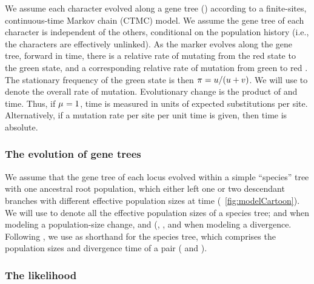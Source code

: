 We assume each character evolved along a gene tree (\genetree)
according to a finite-sites, continuous-time Markov chain (CTMC) model.
We assume the gene tree of each character is independent of the others,
conditional on the population history (i.e., the characters are effectively
unlinked).
As the marker evolves along the gene tree, forward in time, there is a relative
rate \rgmurate of mutating from the red state to the green state,
and a corresponding relative rate \grmurate of mutation from green to red
\citep{Bryant2012,Oaks2018ecoevolity}.
The stationary frequency of the green state is then
$\pi_{} = u / (u + v)$.
We will use \murate to denote the overall rate of mutation.
Evolutionary change is the product of \murate and time.
Thus, if $\mu_{} = 1$, time is measured in
units of expected substitutions per site.
Alternatively, if a mutation rate per site per unit time is given, then time is
absolute.

\subsubsection{The evolution of gene trees}

We assume that the gene tree of each locus evolved within a simple
``species'' tree with one ancestral root population, which either
left one or two descendant branches with different effective population sizes
at time \comparisonetime
(\fig{}~\ref{fig:modelCartoon}).
We will use
\comparisonpopsizes{}
to denote all the effective population sizes of a species tree;
\epopsize[\rootpopindex] and 
\epopsize[\descendantpopindex{1}] when modeling a population-size change, and
(\epopsize[\rootpopindex],
\epopsize[\descendantpopindex{1}],
and \epopsize[\descendantpopindex{2}] when modeling a divergence.
Following \citet{Oaks2018ecoevolity}, we use
\sptree{}
as shorthand for the species tree, which comprises the population sizes and
divergence time of a pair
(\comparisonpopsizes{} and \comparisonetime{}).


\subsubsection{The likelihood}

